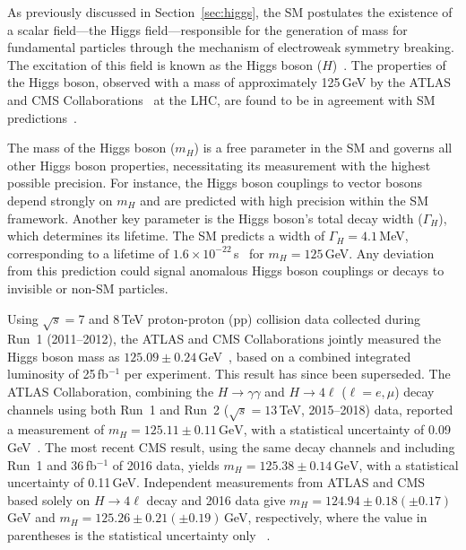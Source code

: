 As previously discussed in Section~\ref{sec:higgs}, the SM postulates the existence of a scalar field---the Higgs field---responsible for the generation of mass for fundamental particles through the mechanism of electroweak symmetry breaking. The excitation of this field is known as the Higgs boson ($H$)~\cite{StandardModel67_1, Englert:1964et, Higgs:1964ia, Higgs:1964pj, Guralnik:1964eu, StandardModel67_2, StandardModel67_3}. The properties of the Higgs boson, observed with a mass of approximately 125\,GeV by the ATLAS and CMS Collaborations~\cite{Aad:2012tfa, Chatrchyan:2012xdj, Chatrchyan:2013lba} at the LHC, are found to be in agreement with SM predictions~\cite{ATLASnature, CMSnature}. 

The mass of the Higgs boson ($m_H$) is a free parameter in the SM and governs all other Higgs boson properties, necessitating its measurement with the highest possible precision. For instance, the Higgs boson couplings to vector bosons depend strongly on $m_H$ and are predicted with high precision within the SM framework. Another key parameter is the Higgs boson's total decay width ($\Gamma_H$), which determines its lifetime. The SM predicts a width of $\Gamma_H = 4.1$\,MeV, corresponding to a lifetime of $1.6 \times 10^{-22}$\,s~\cite{deFlorian:2016spz} for $m_H = 125$\,GeV. Any deviation from this prediction could signal anomalous Higgs boson couplings or decays to invisible or non-SM particles.

Using $\sqrt{s} = $7 and 8\,TeV proton-proton (pp) collision data collected during Run~1 (2011–2012), the ATLAS and CMS Collaborations jointly measured the Higgs boson mass as $125.09 \pm 0.24$\,GeV~\cite{Aad:2015zhl}, based on a combined integrated luminosity of 25\,fb$^{-1}$ per experiment. This result has since been superseded. The ATLAS Collaboration, combining the $H \to \gamma\gamma$ and $H \to 4\ell$ ($\ell = e, \mu$) decay channels using both Run~1 and Run~2 ($\sqrt{s} = 13$\,TeV, 2015–2018) data, reported a measurement of $m_H = 125.11 \pm 0.11\,\mathrm{GeV}$, with a statistical uncertainty of 0.09\,GeV~\cite{ATLAS_mass}. The most recent CMS result, using the same decay channels and including Run~1 and 36\,fb$^{-1}$ of 2016 data, yields $m_H = 125.38 \pm 0.14\,\mathrm{GeV}$, with a statistical uncertainty of 0.11\,GeV. Independent measurements from ATLAS and CMS based solely on $H \to 4\ell$ decay and 2016 data give $m_H = 124.94 \pm 0.18 (\pm 0.17)$\,GeV and $m_H = 125.26 \pm 0.21 (\pm 0.19)$\,GeV, respectively, where the value in parentheses is the statistical uncertainty only ~\cite{Aad:2015zhl, ATLAS_mass}.

